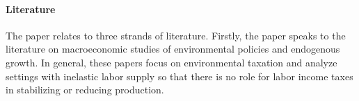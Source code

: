 \paragraph{Literature}

 

The paper relates to three strands of literature. 
Firstly, the paper speaks to the literature on macroeconomic studies of environmental policies and endogenous growth.
In general, these papers focus on environmental taxation and analyze settings with inelastic labor supply so that there is no role for labor income taxes in stabilizing or reducing production.

